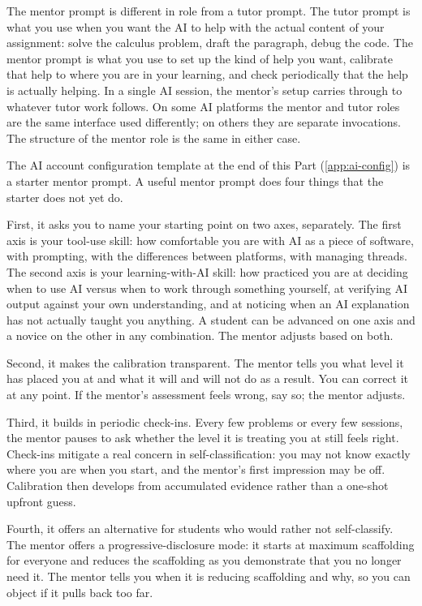 \documentclass{SIAMbook2023}
\begin{document}
The mentor prompt is different in role from a tutor prompt. The tutor prompt is what you use when you want the AI to help with the actual content of your assignment: solve the calculus problem, draft the paragraph, debug the code. The mentor prompt is what you use to set up the kind of help you want, calibrate that help to where you are in your learning, and check periodically that the help is actually helping. In a single AI session, the mentor's setup carries through to whatever tutor work follows. On some AI platforms the mentor and tutor roles are the same interface used differently; on others they are separate invocations. The structure of the mentor role is the same in either case.

The AI account configuration template at the end of this Part (\cref{app:ai-config}) is a starter mentor prompt. A useful mentor prompt does four things that the starter does not yet do.

First, it asks you to name your starting point on two axes, separately. The first axis is your tool-use skill: how comfortable you are with AI as a piece of software, with prompting, with the differences between platforms, with managing threads. The second axis is your learning-with-AI skill: how practiced you are at deciding when to use AI versus when to work through something yourself, at verifying AI output against your own understanding, and at noticing when an AI explanation has not actually taught you anything. A student can be advanced on one axis and a novice on the other in any combination. The mentor adjusts based on both.

Second, it makes the calibration transparent. The mentor tells you what level it has placed you at and what it will and will not do as a result. You can correct it at any point. If the mentor's assessment feels wrong, say so; the mentor adjusts.

Third, it builds in periodic check-ins. Every few problems or every few sessions, the mentor pauses to ask whether the level it is treating you at still feels right. Check-ins mitigate a real concern in self-classification: you may not know exactly where you are when you start, and the mentor's first impression may be off. Calibration then develops from accumulated evidence rather than a one-shot upfront guess.

Fourth, it offers an alternative for students who would rather not self-classify. The mentor offers a progressive-disclosure mode: it starts at maximum scaffolding for everyone and reduces the scaffolding as you demonstrate that you no longer need it. The mentor tells you when it is reducing scaffolding and why, so you can object if it pulls back too far.
\end{document}
